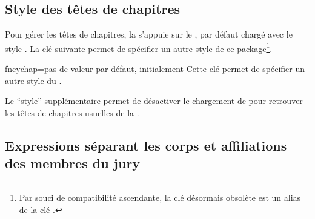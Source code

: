 \subsection{Style des têtes de chapitres}\label{sec-style-des-tetes}

Pour gérer les têtes de chapitres, la \yatCl{} s'appuie sur le
, par défaut chargé avec le style . La
clé  suivante permet de spécifier un autre style de ce
package\footnote{Par souci de compatibilité ascendante, la clé désormais
  obsolète  est un alias de la clé
  .}.%
%
{%
  \begin{docKey}{fncychap}{=\textbar{}\textbar{}\textbar{}\textbar{}\textbar{}\textbar{}\textbar{}\textbar{}}{pas
      de valeur par défaut, initialement }
    Cette clé permet de spécifier un autre style du .

    Le \enquote{style} supplémentaire  permet de désactiver le
    chargement de  pour retrouver les têtes de chapitres
    usuelles de la .
  \end{docKey}
}

\subsection{Expressions séparant les corps et affiliations des membres du jury}
\label{sec-expr-separ-les}


